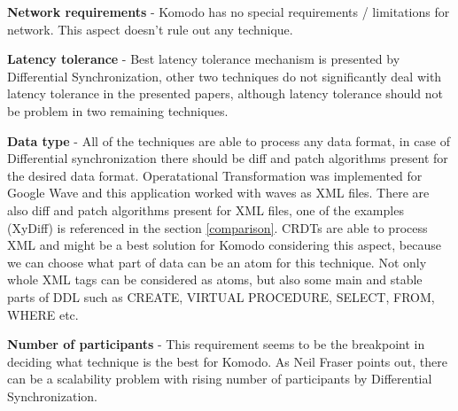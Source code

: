 \documentclass[12pt,oneside]{fithesis2}
\begin{document}
\vspace{3mm} 

\textbf{Network requirements} - Komodo has no special requirements / limitations for network. This aspect doesn't rule out any technique.

\vspace{3mm} 

\textbf{Latency tolerance} - Best latency tolerance mechanism is presented by Differential Synchronization, other two techniques do not significantly deal with latency tolerance in the presented papers, although latency tolerance should not be problem in two remaining techniques.

\vspace{3mm} 

\textbf{Data type} - All of the techniques are able to process any data format, in case of Differential synchronization there should be diff and patch algorithms present for the desired data format. Operatational Transformation was implemented for Google Wave and this application worked with waves as XML files. There are also diff and patch algorithms present for XML files, one of the examples (XyDiff) is referenced in the section \ref{comparison}. CRDTs are able to process XML and might be a best solution for Komodo considering this aspect, because we can choose what part of data can be an atom for this technique. Not only whole XML tags can be considered as atoms, but also some main and stable parts of DDL such as CREATE, VIRTUAL PROCEDURE, SELECT, FROM, WHERE etc.

\vspace{3mm} 

\textbf{Number of participants} - This requirement seems to be the breakpoint in deciding what technique is the best for Komodo. As Neil Fraser \cite{Fraser} points out, there can be a scalability problem with rising number of participants by Differential Synchronization.

\vspace{3mm} 
\end{document}
